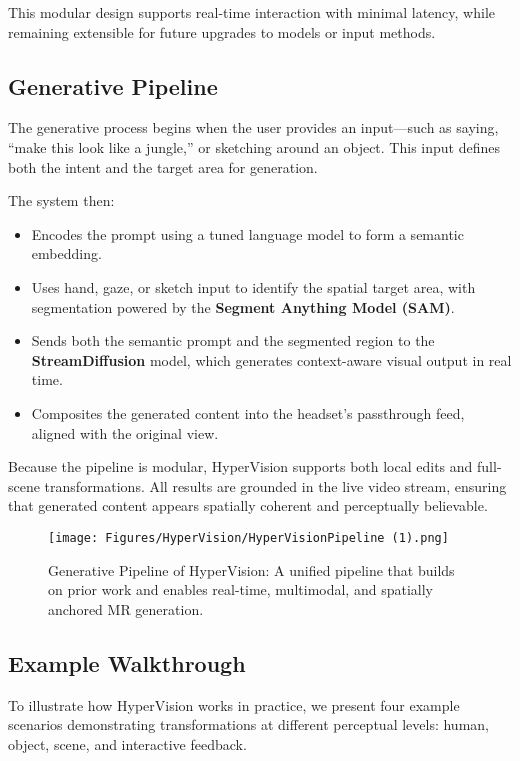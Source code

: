 This modular design supports real-time interaction with minimal latency, while remaining extensible for future upgrades to models or input methods.

\subsection{Generative Pipeline}

The generative process begins when the user provides an input—such as saying, “make this look like a jungle,” or sketching around an object. This input defines both the intent and the target area for generation.

The system then:
\begin{itemize}
    \item Encodes the prompt using a tuned language model to form a semantic embedding.
    \item Uses hand, gaze, or sketch input to identify the spatial target area, with segmentation powered by the \textbf{Segment Anything Model (SAM)}.
    \item Sends both the semantic prompt and the segmented region to the \textbf{StreamDiffusion} model, which generates context-aware visual output in real time.
    \item Composites the generated content into the headset's passthrough feed, aligned with the original view.
\end{itemize}

Because the pipeline is modular, HyperVision supports both local edits and full-scene transformations. All results are grounded in the live video stream, ensuring that generated content appears spatially coherent and perceptually believable.

\begin{figure}[h]
    \centering
    \texttt{[image: Figures/HyperVision/HyperVisionPipeline (1).png]}
    \caption{Generative Pipeline of HyperVision: A unified pipeline that builds on prior work and enables real-time, multimodal, and spatially anchored MR generation.}
    \label{fig:Pipeline}
\end{figure}



\subsection{Example Walkthrough}

To illustrate how HyperVision works in practice, we present four example scenarios demonstrating transformations at different perceptual levels: human, object, scene, and interactive feedback.

